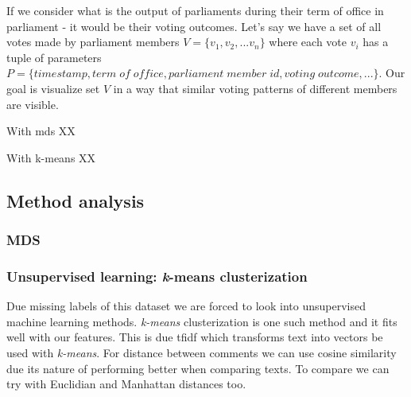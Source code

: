 \documentclass[a4paper,12pt]{article}
\begin{document}
 	If we consider what is the output of parliaments during their term of office in parliament - it would be their voting outcomes. Let's say we have a set of all votes made by parliament members $V = \{v_1, v_2, ... v_n\}$ where each vote $v_i$ has a tuple of parameters $P = \{timestamp, term\; of\; office, parliament\;member\;id, voting\;outcome,...\}$. Our goal is visualize set $V$ in a way that similar voting patterns of different members are visible. 
 	
 	With \gls{mds} XX
 	
 	With \gls{k-means} XX
 
 	
 	
 	
 	\subsection{Method analysis}
	\subsubsection{MDS}
	\subsubsection{Unsupervised learning: {\textit k-means} clusterization }
    
    Due missing labels of this dataset we are forced to look into unsupervised machine learning methods. \textit{k-means} clusterization \cite{clusterization} is one such method and it fits well with our features. This is due \acrshort{tfidf} which transforms text into vectors be used with \textit{k-means}.
    For distance between comments we can use cosine similarity \cite{cosine_similarity} due its nature of performing better when comparing texts. To compare we can try with Euclidian and Manhattan distances too.
\end{document}
